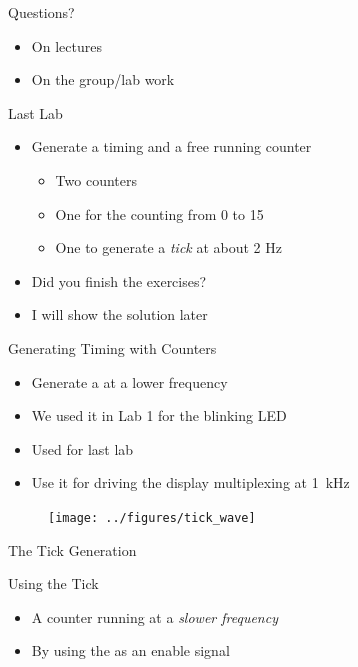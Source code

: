 \begin{frame}[fragile]{Questions?}
\begin{itemize}
\item On lectures
\item On the group/lab work
\end{itemize}
\end{frame}

\begin{frame}[fragile]{Last Lab}
\begin{itemize}
\item Generate a timing and a free running counter
\begin{itemize}
\item Two counters
\item One for the counting from 0 to 15
\item One to generate a \emph{tick} at about 2 Hz
\end{itemize}
\item Did you finish the exercises?
\item I will show the solution later
\end{itemize}
\end{frame}

\begin{frame}[fragile]{Generating Timing with Counters}
\begin{itemize}
\item Generate a  at a lower frequency
\item We used it in Lab 1 for the blinking LED
\item Used for last lab
\item Use it for driving the display multiplexing at 1~kHz
\end{itemize}
\begin{figure}
  \texttt{[image: ../figures/tick\_wave]}
\end{figure}
\end{frame}


\begin{frame}[fragile]{The Tick Generation}
\end{frame}

\begin{frame}[fragile]{Using the Tick}
\begin{itemize}
\item A counter running at a \emph{slower frequency}
\item By using the  as an enable signal
\end{itemize}
\end{frame}

